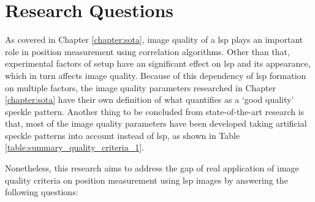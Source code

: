 \chapter{Research Questions}\label{chap:research_questions}

As covered in Chapter \ref{chapter:sota}, image quality of a \gls{lsp} plays an important role in position measurement using correlation algorithms. Other than that, experimental factors of setup have an significant effect on \gls{lsp} and its appearance, which in turn affects image quality. Because of this dependency of \gls{lsp} formation on multiple factors, the image quality parameters researched in Chapter \ref{chapter:sota} have their own definition of what quantifies as a `good quality' speckle pattern. Another thing to be concluded from state-of-the-art research is that, most of the image quality parameters have been developed taking artificial speckle patterns into account instead of \gls{lsp}, as shown in Table \ref{table:summary_quality_criteria_1}. 

\vspace{5mm}
\noindent Nonetheless, this research aims to address the gap of real application of image quality criteria on position measurement using \gls{lsp} images by answering the following questions:

